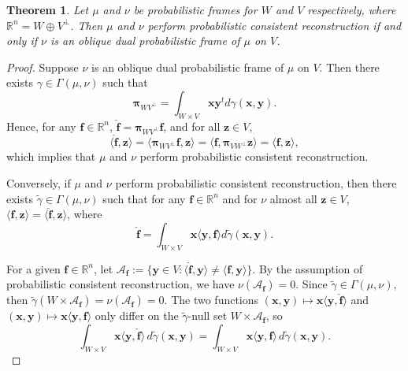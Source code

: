 \documentclass{amsart}
\numberwithin{equation}{section}
\newcommand{\bpi}{{\boldsymbol{\pi}}}
\theoremstyle{plain}
\newtheorem{theorem}{Theorem}[section]
\theoremstyle{remark}
\theoremstyle{definition}
\begin{document}
\begin{theorem}
  Let $\mu$ and $\nu$ be probabilistic frames for $W$ and $V$ respectively, where $\mathbb{R}^n = W \oplus V^\perp$. Then $\mu$ and $\nu$ perform probabilistic consistent reconstruction if and only if $\nu$ is an oblique dual probabilistic frame of $\mu$ on $V$. 
\end{theorem}
\begin{proof}
Suppose $\nu$ is an oblique dual probabilistic frame of $\mu$ on $V$. Then there exists $\gamma \in \Gamma(\mu, \nu)$ such that 
\begin{equation*}
    \bpi_{WV^\perp} = \int_{W \times V} \mathbf{x} \mathbf{y}^t d\gamma(\mathbf{x}, \mathbf{y}).
\end{equation*}
Hence, for any $\mathbf{f} \in \mathbb{R}^n$, $\hat{\mathbf{f}} = \bpi_{WV^\perp} \mathbf{f}$, and for all $\mathbf{z} \in V$, 
\begin{equation*}
     \langle \hat{\mathbf{f}}, \mathbf{z}  \rangle = \langle \bpi_{WV^\perp} \mathbf{f}, \mathbf{z}  \rangle = \langle \mathbf{f}, \bpi_{VW^\perp} \mathbf{z} \rangle  = \langle \mathbf{f}, \mathbf{z} \rangle, 
\end{equation*}
which implies that $\mu$ and $\nu$ perform probabilistic consistent reconstruction. 


Conversely, if $\mu$ and $\nu$ perform probabilistic consistent reconstruction, then there exists $\tilde{\gamma} \in \Gamma(\mu, \nu)$ such that for any $\mathbf{f} \in \mathbb{R}^n$ and for $\nu$ almost all $\mathbf{z} \in V$, $ \langle \mathbf{f}, \mathbf{z}  \rangle = \langle \hat{\mathbf{f}},  \mathbf{z} \rangle$, where
\begin{equation*}
    \hat{\mathbf{f}} = \int_{W \times V} \mathbf{x} \langle \mathbf{y, f} \rangle d\tilde{\gamma}(\mathbf{x}, \mathbf{y}).
\end{equation*}

For a given $\mathbf{f} \in \mathbb{R}^n$, let 
$\mathscr{A}_{\mathbf{f}}:= \{\mathbf{y} \in V: \langle \hat{\mathbf{f}},  \mathbf{y}  \rangle  \neq \langle \mathbf{f}, \mathbf{y} \rangle \}$. 
By the assumption of probabilistic consistent reconstruction, we have 
$\nu(\mathscr{A}_{\mathbf{f}}) = 0$. Since $\tilde{\gamma} \in \Gamma(\mu, \nu)$, then $\tilde{\gamma}(W \times \mathscr{A}_{\mathbf{f}}) = \nu(\mathscr{A}_{\mathbf{f}}) = 0$. The two functions 
$(\mathbf{x}, \mathbf{y}) \mapsto \mathbf{x} \langle \mathbf{y}, \hat{\mathbf{f}} \rangle$
and 
$(\mathbf{x}, \mathbf{y}) \mapsto \mathbf{x} \langle \mathbf{y}, \mathbf{f} \rangle$
only differ on the $\tilde{\gamma}$-null set $W \times \mathscr{A}_{\mathbf{f}}$, so
\begin{equation} \label{eq:F is a projection}
\int_{W \times V} \mathbf{x} \langle \mathbf{y}, \hat{\mathbf{f}} \rangle 
\, d\tilde{\gamma}(\mathbf{x}, \mathbf{y})
=
\int_{W \times V} \mathbf{x} \langle \mathbf{y}, \mathbf{f} \rangle 
\, d\tilde{\gamma}(\mathbf{x}, \mathbf{y}).
\end{equation}


\end{proof}
\end{document}
